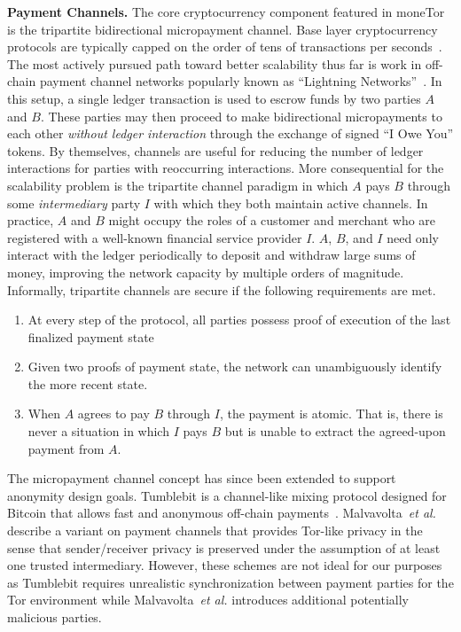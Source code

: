 \noindent\textbf{Payment Channels.}
The core cryptocurrency component featured in moneTor is the tripartite
bidirectional micropayment channel. Base layer cryptocurrency protocols are
typically capped on the order of tens of transactions per
seconds~\cite{team2018blockchain}. The most actively pursued path toward better
scalability thus far is work in off-chain payment channel networks popularly
known as ``Lightning Networks''~\cite{poon2016bitcoin}. In this setup, a single
ledger transaction is used to escrow funds by two parties $A$ and $B$. These
parties may then proceed to make bidirectional micropayments to each other
\emph{without ledger interaction} through the exchange of signed ``I Owe You''
tokens. By themselves, channels are useful for reducing the number of ledger
interactions for parties with reoccurring interactions. More consequential for
the scalability problem is the tripartite channel paradigm in which $A$ pays $B$
through some \emph{intermediary} party $I$ with which they both maintain active
channels. In practice, $A$ and $B$ might occupy the roles of a customer and
merchant who are registered with a well-known financial service provider $I$.
$A$, $B$, and $I$ need only interact with the ledger periodically to deposit and
withdraw large sums of money, improving the network capacity by multiple orders
of magnitude. Informally, tripartite channels are secure if the following
requirements are met.

\begin{enumerate}
\item At every step of the protocol, all parties possess proof of execution of
  the last finalized payment state
\item Given two proofs of payment state, the network can unambiguously identify
  the more recent state.
\item When $A$ agrees to pay $B$ through $I$, the payment is atomic. That is,
  there is never a situation in which $I$ pays $B$ but is unable to extract the
  agreed-upon payment from $A$.
\end{enumerate}


 The micropayment channel concept has since been extended to support anonymity
 design goals. Tumblebit is a channel-like mixing protocol designed for Bitcoin
 that allows fast and anonymous off-chain payments~\cite{heilman2017tumblebit}.
 Malvavolta~\textit{et al.}~\cite{malavolta2017concurrency} describe a variant on
 payment channels that provides Tor-like privacy in the sense that
 sender/receiver privacy is preserved under the assumption of at least one
 trusted intermediary. However, these schemes are not ideal for our purposes as
 Tumblebit requires unrealistic synchronization between payment parties for the
 Tor environment while Malvavolta~\textit{et al.} introduces additional
 potentially malicious parties.

